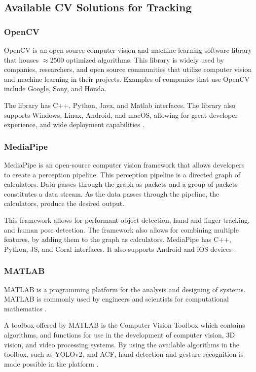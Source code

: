 \documentclass{report}
\begin{document}
\subsection{Available CV Solutions for Tracking}

\subsubsection{OpenCV}

OpenCV is an open-source computer vision and machine learning software library
that houses ${\approx2500}$ optimized algorithms. This library is widely used by
companies, researchers, and open source communities that utilize computer vision
and machine learning in their projects. Examples of companies that use OpenCV
include Google, Sony, and Honda.

The library has C++, Python, Java, and Matlab interfaces. The library also supports
Windows, Linux, Android, and macOS, allowing for great developer experience, and
wide deployment capabilities \parencite{opencv}.

\subsubsection{MediaPipe}
\label{section:rrl-mediapipe}

MediaPipe is an open-source computer vision framework that allows developers to
create a perception pipeline. This perception pipeline is a directed graph of
calculators. Data passes through the graph as packets and a group of packets
constitutes a data stream. As the data passes through the pipeline, the
calculators, produce the desired output.

This framework allows for performant object detection, hand and finger tracking,
and human pose detection. The framework also allows for combining multiple
features, by adding them to the graph as calculators. MediaPipe has C++, Python,
JS, and Coral interfaces. It also supports Android and iOS devices
\parencite{mediapipe}.

\subsubsection{MATLAB}
MATLAB is a programming platform for the analysis and designing of systems.
MATLAB is commonly used by engineers and scientists for computational
mathematics \parencite{what-matlab}.

A toolbox offered by MATLAB is the Computer Vision Toolbox which contains
algorithms, and functions for use in the development of computer vision, 3D
vision, and video processing systems. By using the available algorithms in the
toolbox, such as YOLOv2, and ACF, hand detection and gesture recognition is made
possible in the platform \parencite{matlab}.
\end{document}
